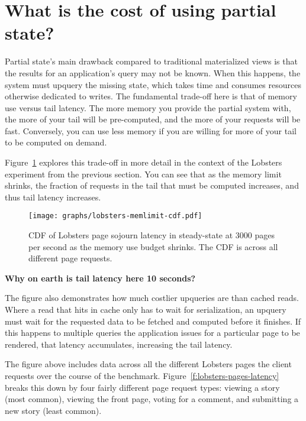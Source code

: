 \section{What is the cost of using partial state?}
\label{s:eval:cost}

Partial state's main drawback compared to traditional materialized views is
that the results for an application's query may not be known. When this happens,
the system must upquery the missing state, which takes time and consumes
resources otherwise dedicated to writes. The fundamental trade-off here is that
of memory use versus tail latency. The more memory you provide the partial
system with, the more of your tail will be pre-computed, and the more of your
requests will be fast. Conversely, you can use less memory if you are willing
for more of your tail to be computed on demand.

Figure~\ref{f:lobsters-mem-latency} explores this trade-off in more detail in
the context of the Lobsters experiment from the previous section. You can see
that as the memory limit shrinks, the fraction of requests in the tail that must
be computed increases, and thus tail latency increases.

\begin{figure}[ht]
  \centering
  \texttt{[image: graphs/lobsters-memlimit-cdf.pdf]}
  \caption{CDF of Lobsters page sojourn latency in steady-state at 3000 pages
  per second as the memory use budget shrinks. The CDF is across all different
  page requests.}
  \label{f:lobsters-mem-latency}
\end{figure}

\begin{inprogress}
  \textbf{Why on earth is tail latency here 10 seconds?}
\end{inprogress}

The figure also demonstrates how much costlier upqueries are than cached
reads. Where a read that hits in cache only has to wait for serialization, an
upquery must wait for the requested data to be fetched and computed before it
finishes. If this happens to multiple queries the application issues for a
particular page to be rendered, that latency accumulates, increasing the tail
latency.

The figure above includes data across all the different Lobsters pages the
client requests over the course of the benchmark.
Figure~\ref{f:lobsters-pages-latency} breaks this down by four fairly
different page request types: viewing a story (most common), viewing the front
page, voting for a comment, and submitting a new story (least common).

